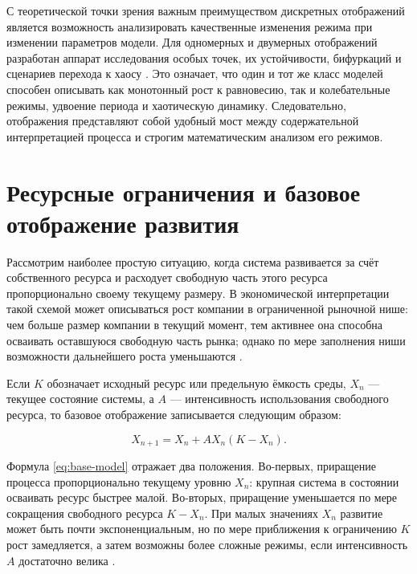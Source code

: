 С теоретической точки зрения важным преимуществом дискретных отображений является возможность анализировать качественные изменения режима при изменении параметров модели. Для одномерных и двумерных отображений разработан аппарат исследования особых точек, их устойчивости, бифуркаций и сценариев перехода к хаосу \cite{kuznetsov-maps,kuznetsov-bifurcations,feigenbaum-ufn}. Это означает, что один и тот же класс моделей способен описывать как монотонный рост к равновесию, так и колебательные режимы, удвоение периода и хаотическую динамику. Следовательно, отображения представляют собой удобный мост между содержательной интерпретацией процесса и строгим математическим анализом его режимов.

\section{Ресурсные ограничения и базовое отображение развития}
\label{sec:resource-limits-and-base-map}

Рассмотрим наиболее простую ситуацию, когда система развивается за счёт собственного ресурса и расходует свободную часть этого ресурса пропорционально своему текущему размеру. В экономической интерпретации такой схемой может описываться рост компании в ограниченной рыночной нише: чем больше размер компании в текущий момент, тем активнее она способна осваивать оставшуюся свободную часть рынка; однако по мере заполнения ниши возможности дальнейшего роста уменьшаются \cite{polunin-2019,polunin-yudanov-2020}.

Если \(K\) обозначает исходный ресурс или предельную ёмкость среды, \(X_n\) --- текущее состояние системы, а \(A\) --- интенсивность использования свободного ресурса, то базовое отображение записывается следующим образом:

\begin{equation}
X_{n+1}=X_n + A X_n (K-X_n).
\label{eq:base-model}
\end{equation}

Формула \eqref{eq:base-model} отражает два положения. Во-первых, приращение процесса пропорционально текущему уровню \(X_n\): крупная система в состоянии осваивать ресурс быстрее малой. Во-вторых, приращение уменьшается по мере сокращения свободного ресурса \(K-X_n\). При малых значениях \(X_n\) развитие может быть почти экспоненциальным, но по мере приближения к ограничению \(K\) рост замедляется, а затем возможны более сложные режимы, если интенсивность \(A\) достаточно велика \cite{strogatz,feigenbaum-ufn}.

